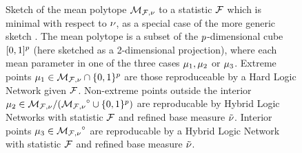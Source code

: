 
\begin{figure}[t!]
    \begin{center}
        
    \end{center}
    \caption{Sketch of the mean polytope ${\mathcal{M}_{\mathcal{F},\nu}}$ to a statistic $\mathcal{F}$ which is minimal with respect to $\nu$, as a special case of the more generic sketch .
    The mean polytope is a subset of the $p$-dimensional cube $[0,1]^p$ (here sketched as a 2-dimensional projection), where each mean parameter in one of the three cases $\mu_{1},\mu_{2}$ or $\mu_{3}$.
    Extreme points $\mu_{1}\in\mathcal{M}_{\mathcal{F},\nu}\cap\{0,1\}^{p}$ are those reproduceable by a Hard Logic Network given $\mathcal{F}$.
    Non-extreme points outside the interior $\mu_{2}\in\mathcal{M}_{\mathcal{F},\nu}/({\mathcal{M}_{\mathcal{F},\nu}}^{\circ}\cup\{0,1\}^{p})$ are reproducable by Hybrid Logic Networks with statistic $\mathcal{F}$ and refined base measure $\tilde{\nu}$.
    Interior points $\mu_{3}\in{\mathcal{M}_{\mathcal{F},\nu}}^{\circ}$ are reproducable by a Hybrid Logic Network with statistic $\mathcal{F}$ and refined base measure $\tilde{\nu}$.
    }\label{fig:meansetSketch}
\end{figure}



